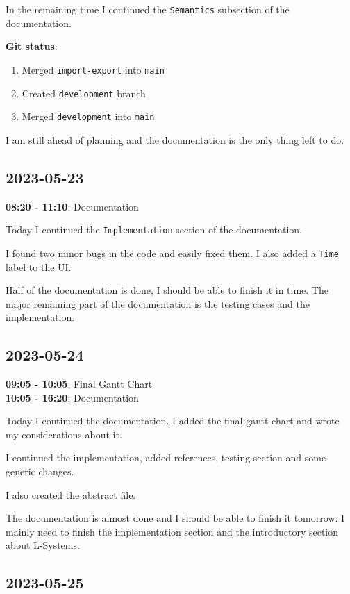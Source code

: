 \documentclass{article}
\begin{document}
In the remaining time I continued the \texttt{Semantics}
subsection of the documentation.

\textbf{Git status}:
\begin{enumerate}
    \item Merged \texttt{import-export} into \texttt{main}
    \item Created \texttt{development} branch
    \item Merged \texttt{development} into \texttt{main}
\end{enumerate}

I am still ahead of planning and the documentation
is the only thing left to do.

\subsection{2023-05-23}

\textbf{08:20 - 11:10}: Documentation

Today I continued the \texttt{Implementation} section of the documentation.

I found two minor bugs in the code and easily fixed them. I also added a
\texttt{Time} label to the UI.

Half of the documentation is done, I should be able to finish it in time.
The major remaining part of the documentation is the testing cases and the implementation.

\subsection{2023-05-24}

\textbf{09:05 - 10:05}: Final Gantt Chart \\
\textbf{10:05 - 16:20}: Documentation

Today I continued the documentation.
I added the final gantt chart and wrote my considerations about it.

I continued the implementation, added references, testing section and some generic changes.

I also created the abstract file.

The documentation is almost done and I should be able to finish it tomorrow.
I mainly need to finish the implementation section and the introductory section about L-Systems.

\subsection{2023-05-25}
\end{document}
